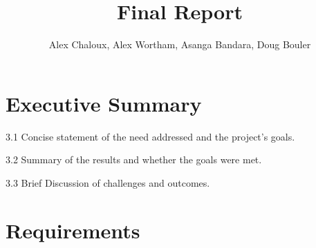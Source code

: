 \documentclass[12pt,letterpaper]{article}
\title{Final Report}
\author{Alex Chaloux, Alex Wortham, Asanga Bandara, Doug Bouler}
\begin{document}
\reqstitlepage

\tableofcontents
\clearpage
{}

\section{Executive Summary}


3.1 Concise statement of the need addressed and the project's goals.

3.2 Summary of the results and whether the goals were met.

3.3 Brief Discussion of challenges and outcomes.

\section{Requirements}
\end{document}
